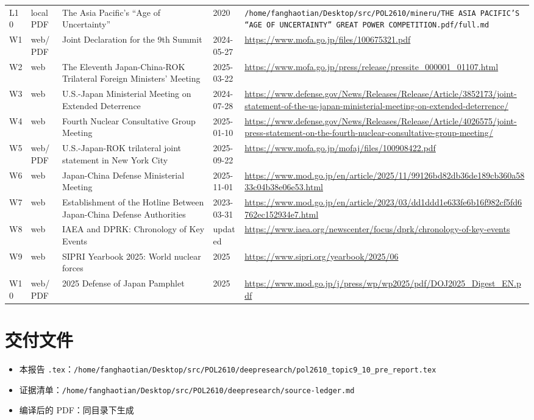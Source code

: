 \documentclass[a4paper]{article}
\begin{document}
\begin{longtable}{p{1.0cm}p{1.6cm}p{4.2cm}p{2.2cm}p{6.0cm}}
L10 & local PDF & The Asia Pacific's ``Age of Uncertainty'' & 2020 & \texttt{/home/fanghaotian/Desktop/src/POL2610/mineru/THE ASIA PACIFIC'S ``AGE OF UNCERTAINTY'' GREAT POWER COMPETITION.pdf/full.md} \\
W1 & web/PDF & Joint Declaration for the 9th Summit & 2024-05-27 & \url{https://www.mofa.go.jp/files/100675321.pdf} \\
W2 & web & The Eleventh Japan-China-ROK Trilateral Foreign Ministers' Meeting & 2025-03-22 & \url{https://www.mofa.go.jp/press/release/pressite_000001_01107.html} \\
W3 & web & U.S.-Japan Ministerial Meeting on Extended Deterrence & 2024-07-28 & \url{https://www.defense.gov/News/Releases/Release/Article/3852173/joint-statement-of-the-us-japan-ministerial-meeting-on-extended-deterrence/} \\
W4 & web & Fourth Nuclear Consultative Group Meeting & 2025-01-10 & \url{https://www.defense.gov/News/Releases/Release/Article/4026575/joint-press-statement-on-the-fourth-nuclear-consultative-group-meeting/} \\
W5 & web/PDF & U.S.-Japan-ROK trilateral joint statement in New York City & 2025-09-22 & \url{https://www.mofa.go.jp/mofaj/files/100908422.pdf} \\
W6 & web & Japan-China Defense Ministerial Meeting & 2025-11-01 & \url{https://www.mod.go.jp/en/article/2025/11/99126bd82db36de189cb360a5833c04b38e06e53.html} \\
W7 & web & Establishment of the Hotline Between Japan-China Defense Authorities & 2023-03-31 & \url{https://www.mod.go.jp/en/article/2023/03/dd1ddd1e633fe6b16f982cf5fd6762ec152934e7.html} \\
W8 & web & IAEA and DPRK: Chronology of Key Events & updated & \url{https://www.iaea.org/newscenter/focus/dprk/chronology-of-key-events} \\
W9 & web & SIPRI Yearbook 2025: World nuclear forces & 2025 & \url{https://www.sipri.org/yearbook/2025/06} \\
W10 & web/PDF & 2025 Defense of Japan Pamphlet & 2025 & \url{https://www.mod.go.jp/j/press/wp/wp2025/pdf/DOJ2025_Digest_EN.pdf} \\
\bottomrule
\end{longtable}

\section{交付文件}

\begin{itemize}
\item 本报告 \texttt{.tex}：\texttt{/home/fanghaotian/Desktop/src/POL2610/deepresearch/pol2610\_topic9\_10\_pre\_report.tex}
\item 证据清单：\texttt{/home/fanghaotian/Desktop/src/POL2610/deepresearch/source-ledger.md}
\item 编译后的 PDF：同目录下生成
\end{itemize}
\end{document}
